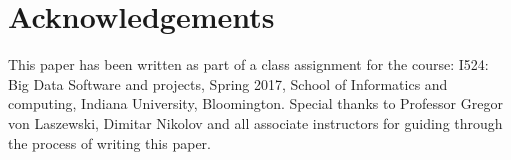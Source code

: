 \documentclass[9pt,twocolumn,twoside]{../../styles/osajnl}
\begin{document}
\section*{Acknowledgements}

This paper has been written as part of a class assignment for the course: 
I524: Big Data Software and projects, Spring 2017, School of Informatics and computing, Indiana University, Bloomington.
Special thanks to Professor Gregor von Laszewski, Dimitar Nikolov and all associate instructors for guiding through the process of writing this paper.




 
\end{document}
